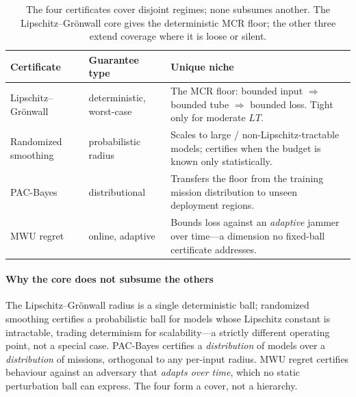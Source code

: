 \begin{table}[t]
\centering
\caption{The four certificates cover disjoint regimes; none subsumes another.
The Lipschitz--Gr\"onwall core gives the deterministic MCR floor; the other
three extend coverage where it is loose or silent.}
\label{tab:certs}
\small
\renewcommand{\arraystretch}{1.15}
\begin{tabularx}{\columnwidth}{@{}
  >{\hsize=0.82\hsize\raggedright\arraybackslash}X
  >{\hsize=0.70\hsize\raggedright\arraybackslash}X
  >{\hsize=1.48\hsize\raggedright\arraybackslash}X@{}}
\toprule
\textbf{Certificate} & \textbf{Guarantee type} & \textbf{Unique niche}\\
\midrule
Lipschitz--Gr\"onwall & deterministic, worst-case & The MCR floor: bounded input $\Rightarrow$ bounded tube $\Rightarrow$ bounded loss. Tight only for moderate $LT$.\\
Randomized smoothing~\cite{cohen2019smoothing} & probabilistic radius & Scales to large / non-Lipschitz-tractable models; certifies when the budget is known only statistically.\\
PAC-Bayes~\cite{viallard2021pacbayes} & distributional & Transfers the floor from the training mission distribution to unseen deployment regions.\\
MWU regret~\cite{arora2012mwu,balcan2015commitment} & online, adaptive & Bounds loss against an \emph{adaptive} jammer over time---a dimension no fixed-ball certificate addresses.\\
\bottomrule
\end{tabularx}
\end{table}

\paragraph{Why the core does not subsume the others}
The Lipschitz--Gr\"onwall radius is a single deterministic ball; randomized
smoothing certifies a probabilistic ball for models whose Lipschitz constant is
intractable, trading determinism for scalability---a strictly different
operating point, not a special case. PAC-Bayes certifies a \emph{distribution}
of models over a \emph{distribution} of missions, orthogonal to any per-input
radius. MWU regret certifies behaviour against an adversary that \emph{adapts
over time}, which no static perturbation ball can express. The four form a
cover, not a hierarchy.

